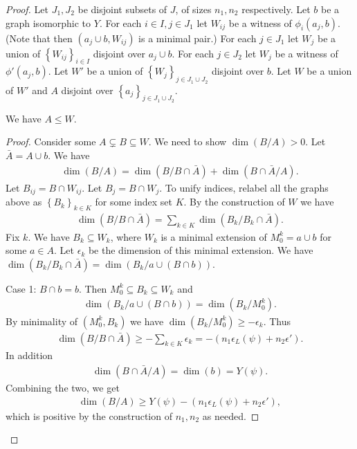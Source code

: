 \documentclass{amsart}
\newcommand{\BA}{\bar A}
\newcommand{\Y}{Y}
\newcommand{\curly}[1]{\left\{#1\right\}}
\newcommand{\paren}[1]{\left(#1\right)}
\begin{document}
\begin{proof}
  Let $J_1, J_2$ be disjoint subsets of $J$, of sizes $n_1, n_2$ respectively.
  Let $b$ be a graph isomorphic to $\Y$.
  For each $i \in I, j \in J_1$ let $W_{ij}$ be a witness of $\phi_i(a_j, b)$.
  (Note that then $(a_j \cup b, W_{ij})$ is a minimal pair.)
  For each $j \in J_1$ let $W_j$ be a union of $\curly{W_{ij}}_{i \in I}$ disjoint over $a_j \cup b$.
  For each $j \in J_2$ let $W_{j}$ be a witness of $\phi'(a_j, b)$.
  Let $W'$ be a union of $\curly{W_j}_{j \in J_1 \cup J_2}$ disjoint over $b$.
  Let $W$ be a union of $W'$ and $A$ disjoint over $\curly{a_j}_{j \in J_1 \cup J_2}$.
  \begin{Claim}
    We have $A \leq W$.
  \end{Claim}
  \begin{proof}
    Consider some $A \subsetneq B \subseteq W$.
    We need to show $\dim (B/A) > 0$.
    Let $\BA = A \cup b$.
    We have
    \begin{align*}
      \dim(B/A) = \dim(B/ B \cap \BA) + \dim(B \cap \BA / A).
    \end{align*}
    Let $B_{ij} = B \cap W_{ij}$.
    Let $B_{j} = B \cap W_{j}$.
    To unify indices, relabel all the graphs above as $\curly{B_k}_{k \in K}$ for some index set $K$.
    By the construction of $W$ we have
    \begin{align*}
      \dim(B/ B \cap \BA) = \sum_{k \in K} \dim(B_k/ B_k \cap \BA).
    \end{align*}
    Fix $k$.
    We have $B_k \subseteq W_k$, where $W_k$ is a minimal extension of $M^k_0 = a \cup b$ for some $a \in A$.
    Let $\epsilon_k$ be the dimension of this minimal extension.
    We have $\dim(B_k / B_k \cap \BA) = \dim(B_k / a \cup (B \cap b))$.

    Case 1: $B \cap b = b$.
    Then $M_0^k \subseteq B_k \subseteq W_k$ and
    \begin{align*}
      \dim(B_k / a \cup (B \cap b)) = \dim (B_k/M_0^k).
    \end{align*}
    By minimality of $(M_0^k, B_k)$ we have $\dim (B_k/M_0^k) \geq -\epsilon_k$.
    Thus
    \begin{align*}
      \dim(B/ B \cap \BA) \geq - \sum_{k \in K} \epsilon_k = -\paren{n_1 \epsilon_L(\psi) + n_2 \epsilon'}.
    \end{align*}
    In addition
    \begin{align*}
      \dim(B \cap \BA / A) = \dim (b) = Y(\psi).
    \end{align*}
    Combining the two, we get
    \begin{align*}
      \dim(B/A) \geq Y(\psi) - \paren{n_1 \epsilon_L(\psi) + n_2 \epsilon'},
    \end{align*}
    which is positive by the construction of $n_1, n_2$ as needed.
    

\end{proof}
\end{proof}
\end{document}
